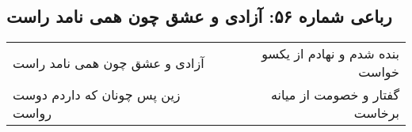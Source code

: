 \begin{center}
\section*{رباعی شماره ۵۶: آزادی و عشق چون همی نامد راست}
\label{sec:sh056}
\begin{longtable}{l p{0.5cm} r}
آزادی و عشق چون همی نامد راست
&&
بنده شدم و نهادم از یکسو خواست
\\
زین پس چونان که داردم دوست رواست
&&
گفتار و خصومت از میانه برخاست
\\
\end{longtable}
\end{center}
